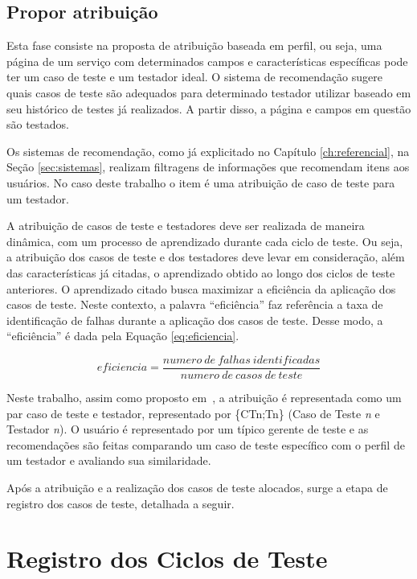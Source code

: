 \subsection{Propor atribuição}

 Esta fase consiste na proposta de atribuição baseada em perfil, ou seja, uma página de um serviço com determinados campos e características específicas pode ter um caso de teste e um testador ideal. O sistema de recomendação sugere quais casos de teste são adequados para determinado testador utilizar baseado em seu histórico de testes já realizados. A partir disso, a página e campos em questão são testados.

 Os sistemas de recomendação, como já explicitado no Capítulo \ref{ch:referencial}, na Seção \ref{sec:sistemas}, realizam filtragens de informações que recomendam itens aos usuários. No caso deste trabalho o item é uma atribuição de caso de teste para um testador.

 A atribuição de casos de teste e testadores deve ser realizada de maneira dinâmica, com um processo de aprendizado durante cada ciclo de teste. Ou seja, a atribuição dos casos de teste e dos testadores deve levar em consideração, além das características já citadas, o aprendizado obtido ao longo dos ciclos de teste anteriores. O aprendizado citado busca maximizar a eficiência da aplicação dos casos de teste. Neste contexto, a palavra ``eficiência'' faz referência a taxa de identificação de falhas durante a aplicação dos casos de teste. Desse modo, a ``eficiência'' é dada pela Equação \ref{eq:eficiencia}.

 \begin{equation}
 \label{eq:eficiencia}
    eficiencia = \frac{numero \ de \ falhas\ identificadas}{numero\ de\ casos\ de\ teste}
 \end{equation}


Neste trabalho, assim como proposto em~\cite{miranda2012recommender}, a atribuição é representada como um par caso de teste e testador, representado por \{CTn;Tn\} (Caso de Teste \emph{n} e Testador \emph{n}). O usuário é representado por um típico gerente de teste e as recomendações são feitas comparando um caso de teste específico com o perfil de um testador e avaliando sua similaridade.

 Após a atribuição e a realização dos casos de teste alocados, surge a etapa de registro dos casos de teste, detalhada a seguir.

\section{Registro dos Ciclos de Teste}

